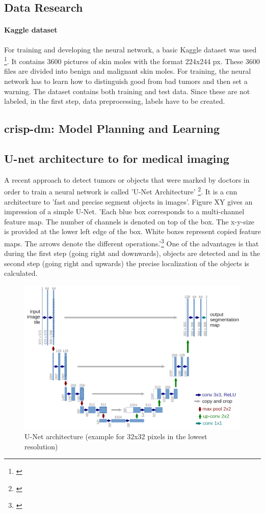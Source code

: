 \subsection{Data Research}
\paragraph{Kaggle dataset}
For training and developing the neural network, a basic Kaggle dataset was used \footnote{\cite{kaggle_dataset}}. It contains 3600 pictures of skin moles with the format 224x244 px. These 3600 files are divided into benign and malignant skin moles. 
For training, the neural network has to learn how to distinguish good from bad tumors and then set a warning. 
The dataset contains both training and test data. Since these are not labeled, in the first step, data preprocessing, labels have to be created.

\subsection{\ac{crisp-dm}: Model Planning and Learning}

\subsection{U-net architecture to for medical imaging}
A recent approach to detect tumors or objects that were marked by doctors in order to train a neural network is called 'U-Net Architecture' \footnote{\cite{unet}}. It is a \ac{cnn} architecture to 'fast and precise segment objects in images'.
Figure XY gives an impression of a simple U-Net. 
'Each blue box corresponds to a multi-channel feature map. The number of channels is denoted on top of the box. The x-y-size is provided at the lower left edge of the box. White boxes represent copied feature maps. The arrows denote the different operations.'\footnote{\cite{unet}}
One of the advantages is that during the first step (going right and downwards), objects are detected and in the second step (going right and upwards) the precise localization of the objects is calculated. 

\begin{figure}[h!]
	\centering
	\includegraphics[width=1\textwidth]{images/u-net-architecture.png}
	\caption{U-Net architecture (example for 32x32 pixels in the lowest resolution)}
	\label{unet}
\end{figure}

